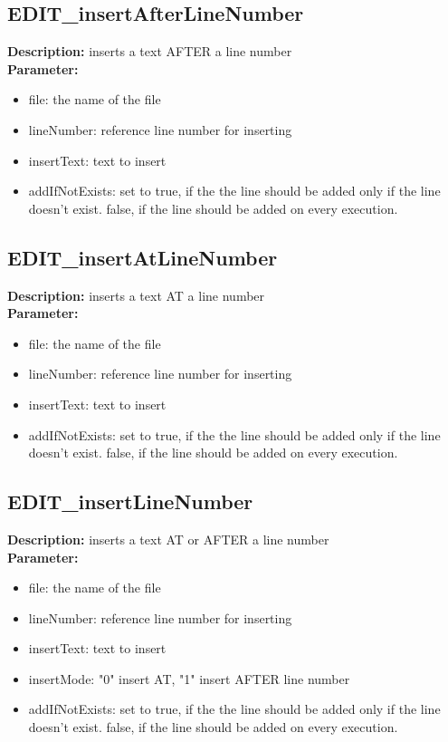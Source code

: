 \subsection{EDIT\_insertAfterLineNumber}
\textbf{Description:} inserts a text AFTER a line number\\
\textbf{Parameter:}
\begin{itemize}
\item file: the name of the file
\item lineNumber: reference line number for inserting
\item insertText: text to insert
\item addIfNotExists: set to true, if the the line should be added only if the line doesn't exist. false, if the line should be added on every execution.
\end{itemize}

\subsection{EDIT\_insertAtLineNumber}
\textbf{Description:} inserts a text AT a line number\\
\textbf{Parameter:}
\begin{itemize}
\item file: the name of the file
\item lineNumber: reference line number for inserting
\item insertText: text to insert
\item addIfNotExists: set to true, if the the line should be added only if the line doesn't exist. false, if the line should be added on every execution.
\end{itemize}

\subsection{EDIT\_insertLineNumber}
\textbf{Description:} inserts a text AT or AFTER a line number\\
\textbf{Parameter:}
\begin{itemize}
\item file: the name of the file
\item lineNumber: reference line number for inserting
\item insertText: text to insert
\item insertMode: "0" insert AT, "1" insert AFTER line number
\item addIfNotExists: set to true, if the the line should be added only if the line doesn't exist. false, if the line should be added on every execution.
\end{itemize}

